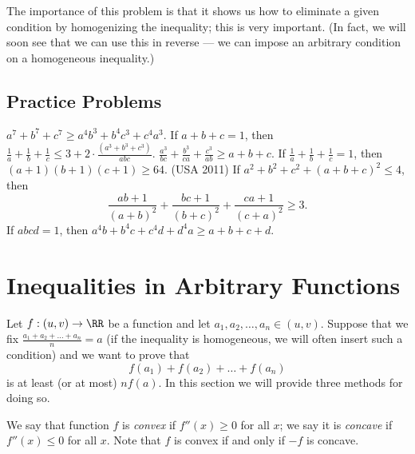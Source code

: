 \documentclass[11pt]{scrartcl}
\begin{document}
The importance of this problem is that it shows us how to eliminate a given condition
by homogenizing the inequality; this is very important.
(In fact, we will soon see that we can use this in reverse ---
we can impose an arbitrary condition on a homogeneous inequality.)

\subsection{Practice Problems}
\begin{enumerate}
  \ii $a^7+b^7+c^7 \ge a^4b^3+b^4c^3+c^4a^3$.
  \ii If $a+b+c=1$, then $\frac1a + \frac 1b + \frac 1c \le 3 + 2 \cdot \frac{(a^3+b^3+c^3)}{abc}$.
  \ii $\frac{a^3}{bc} + \frac{b^3}{ca} + \frac{c^3}{ab} \ge a+b+c$.
  \ii If $\frac1a + \frac1b + \frac 1c =1$, then $(a+1)(b+1)(c+1) \ge 64$.
  \ii (USA 2011) If $a^2+b^2+c^2+(a+b+c)^2 \le 4$, then
  \[ \frac{ab+1}{(a+b)^2} + \frac{bc+1}{(b+c)^2} + \frac{ca+1}{(c+a)^2} \ge 3. \]
  \ii If $abcd=1$, then $a^4b+b^4c+c^4d+d^4a \ge a+b+c+d$.
\end{enumerate}

\section{Inequalities in Arbitrary Functions}
Let $f : (u,v) \to \RR$ be a function and let $a_1, a_2, \dots, a_n \in (u,v)$.
Suppose that we fix $\frac{a_1+a_2 + \dots + a_n}{n} = a$
(if the inequality is homogeneous, we will often insert such a condition)
and we want to prove that
\[ f(a_1) + f(a_2) + \dots + f(a_n) \]
is at least (or at most) $nf(a)$.
In this section we will provide three methods for doing so.

We say that function $f$ is \emph{convex} if $f''(x) \ge 0$ for all $x$;
we say it is \emph{concave} if $f''(x) \le 0$ for all $x$.
Note that $f$ is convex if and only if $-f$ is concave.
\end{document}
